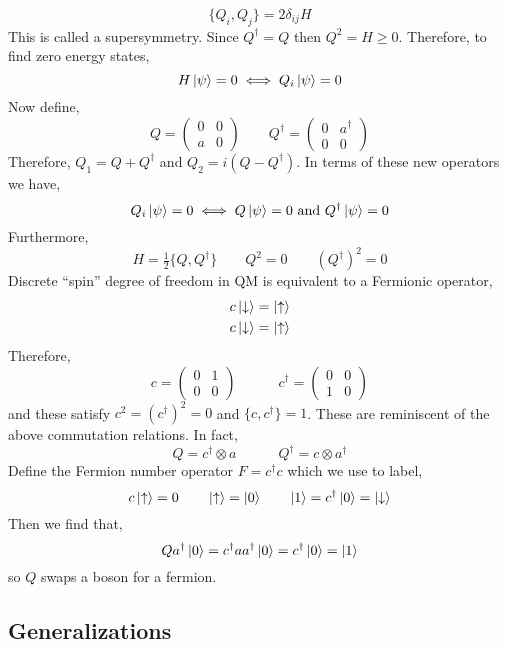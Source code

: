 \documentclass[12pt]{extarticle}
\begin{document}
\[ \{ Q_i, Q_j \} = 2 \delta_{ij} H \]
This is called a supersymmetry. Since $Q^\dagger = Q$ then $Q^2 = H \ge 0$. Therefore, to find zero energy states,
\[ H \left| \psi \right> = 0 \iff Q_i \left| \psi \right> = 0 \]
Now define,
\[ Q = 
\begin{pmatrix}
0 & 0 
\\
a & 0
\end{pmatrix}
\quad \quad Q^\dagger = 
\begin{pmatrix}
0 & a^\dagger
\\
0 & 0 
\end{pmatrix} \]
Therefore, $Q_1 = Q + Q^\dagger$ and $Q_2 = i (Q - Q^\dagger)$. In terms of these new operators we have,
\[ Q_i \left| \psi \right> = 0 \iff Q \left| \psi \right> = 0 \text{ and } Q^\dagger \left| \psi \right> = 0 \]
Furthermore,
\[ H = \tfrac{1}{2} \{ Q, Q^\dagger \} \quad \quad Q^2 = 0 \quad \quad (Q^\dagger)^2 = 0 \]
Discrete ``spin'' degree of freedom in QM is equivalent to a Fermionic operator,
\begin{align*}
c \left| \downarrow \right> & = \left| \uparrow \right>
\\
c \left| \downarrow \right> & = \left| \uparrow \right>
\end{align*}
Therefore,
\[ c = 
\begin{pmatrix}
0 & 1
\\
0 & 0 
\end{pmatrix} 
\quad \quad \quad c^\dagger 
= 
\begin{pmatrix}
0 & 0
\\
1 & 0
\end{pmatrix} \]
and these satisfy $c^2 = (c^\dagger)^2 = 0$ and $\{ c, c^\dagger \} = 1$. These are reminiscent of the above commutation relations. In fact,
\[ Q = c^\dagger \otimes a \quad \quad \quad Q^\dagger = c \otimes a^\dagger \]
Define the Fermion number operator $F = c^\dagger c$ which we use to label,
\[ c \left| \uparrow \right> = 0 \quad \quad \left| \uparrow \right> = \left| 0 \right> \quad \quad \left| 1 \right> = c^\dagger \left| 0 \right> = \left| \downarrow \right> \]
Then we find that,
\[ Q a^\dagger \left| 0 \right> = c^\dagger a a^\dagger \left| 0 \right> = c^\dagger \left| 0 \right> = \left| 1 \right> \]
so $Q$ swaps a boson for a fermion. 

\subsection{Generalizations}
\end{document}
